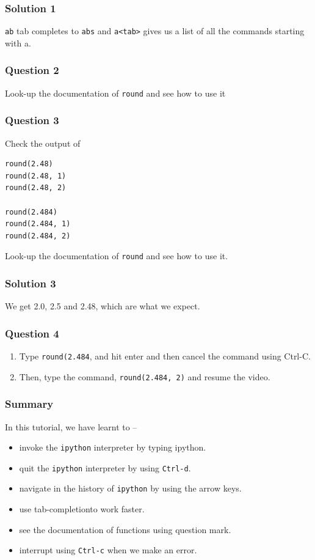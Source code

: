 \documentclass[presentation]{beamer}
\begin{document}
\begin{frame}
\frametitle{Solution 1}
\label{sec-4}

  \texttt{ab} tab completes to \texttt{abs} and \texttt{a<tab>} gives us a list of all the
  commands starting with a.
\end{frame}
\begin{frame}
\frametitle{Question 2}
\label{sec-5}

  Look-up the documentation of \texttt{round} and see how to use it
\end{frame}
\begin{frame}[fragile]
\frametitle{Question 3}
\label{sec-6}

  Check the output of
\lstset{language=Python}
\begin{lstlisting}
round(2.48)
round(2.48, 1)
round(2.48, 2)

round(2.484)
round(2.484, 1)
round(2.484, 2)
\end{lstlisting}
  Look-up the documentation of \texttt{round} and see how to use it.
\end{frame}
\begin{frame}
\frametitle{Solution 3}
\label{sec-7}

  We get 2.0, 2.5 and 2.48, which are what we expect. 
\end{frame}
\begin{frame}
\frametitle{Question 4}
\label{sec-8}


\begin{enumerate}
\item Type \texttt{round(2.484}, and hit enter and then cancel the command
     using Ctrl-C.
\item Then, type the command, \texttt{round(2.484, 2)} and resume
     the video.
\end{enumerate}
\end{frame}
\begin{frame}
\frametitle{Summary}
\label{sec-9}

  In this tutorial, we have learnt to –

\begin{itemize}
\item invoke the \verb~ipython~ interpreter by typing ipython.
\item quit the \verb~ipython~ interpreter by using \verb~Ctrl-d~.
\item navigate in the history of \verb~ipython~ by using the arrow keys.
\item use tab-completionto work faster.
\item see the documentation of functions using question mark.
\item interrupt using \verb~Ctrl-c~ when we make an error.
\end{itemize}
\end{frame}
\end{document}
